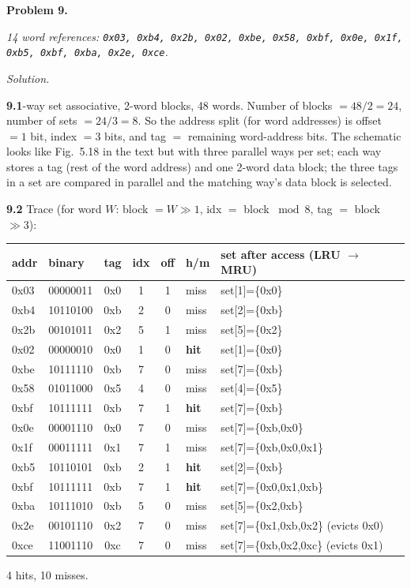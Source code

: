 \documentclass[12pt]{article}
\newcommand{\problem}[1]{\vspace{0.8em}\noindent\textbf{Problem #1.}\vspace{0.35em}}
\newenvironment{solution}{\par\noindent\textit{Solution.}\ }{\par\vspace{1.1em}}
\newcommand{\subproblem}[1]{\par\vspace{0.45em}\noindent\textbf{#1}\quad}
\newcommand{\assigntext}[1]{\par\vspace{0.25em}\small\textit{#1}\par\vspace{0.35em}}
\begin{document}
\problem{9}
\assigntext{14 word references: \texttt{0x03, 0xb4, 0x2b, 0x02, 0xbe, 0x58, 0xbf, 0x0e, 0x1f, 0xb5, 0xbf, 0xba, 0x2e, 0xce}.}

\begin{solution}
\subproblem{9.1} 3-way set associative, 2-word blocks, 48 words. Number of blocks $= 48/2 = 24$, number of sets $= 24/3 = 8$. So the address split (for word addresses) is offset $= 1$ bit, index $= 3$ bits, and tag $= $ remaining word-address bits. The schematic looks like Fig.\ 5.18 in the text but with three parallel ways per set; each way stores a tag (rest of the word address) and one 2-word data block; the three tags in a set are compared in parallel and the matching way's data block is selected.

\subproblem{9.2} Trace (for word $W$: block $= W{\gg}1$, idx $=$ block $\bmod 8$, tag $=$ block ${\gg}3$):

\begin{center}\small
\begin{tabular}{@{}llcccll@{}}\toprule
addr & binary & tag & idx & off & h/m & set after access (LRU $\to$ MRU) \\\midrule
0x03 & 00000011 & 0x0 & 1 & 1 & miss & set[1]=\{0x0\} \\
0xb4 & 10110100 & 0xb & 2 & 0 & miss & set[2]=\{0xb\} \\
0x2b & 00101011 & 0x2 & 5 & 1 & miss & set[5]=\{0x2\} \\
0x02 & 00000010 & 0x0 & 1 & 0 & \textbf{hit}  & set[1]=\{0x0\} \\
0xbe & 10111110 & 0xb & 7 & 0 & miss & set[7]=\{0xb\} \\
0x58 & 01011000 & 0x5 & 4 & 0 & miss & set[4]=\{0x5\} \\
0xbf & 10111111 & 0xb & 7 & 1 & \textbf{hit}  & set[7]=\{0xb\} \\
0x0e & 00001110 & 0x0 & 7 & 0 & miss & set[7]=\{0xb,0x0\} \\
0x1f & 00011111 & 0x1 & 7 & 1 & miss & set[7]=\{0xb,0x0,0x1\} \\
0xb5 & 10110101 & 0xb & 2 & 1 & \textbf{hit}  & set[2]=\{0xb\} \\
0xbf & 10111111 & 0xb & 7 & 1 & \textbf{hit}  & set[7]=\{0x0,0x1,0xb\} \\
0xba & 10111010 & 0xb & 5 & 0 & miss & set[5]=\{0x2,0xb\} \\
0x2e & 00101110 & 0x2 & 7 & 0 & miss & set[7]=\{0x1,0xb,0x2\} (evicts 0x0) \\
0xce & 11001110 & 0xc & 7 & 0 & miss & set[7]=\{0xb,0x2,0xc\} (evicts 0x1) \\
\bottomrule\end{tabular}\end{center}
4 hits, 10 misses.


\end{solution}
\end{document}

